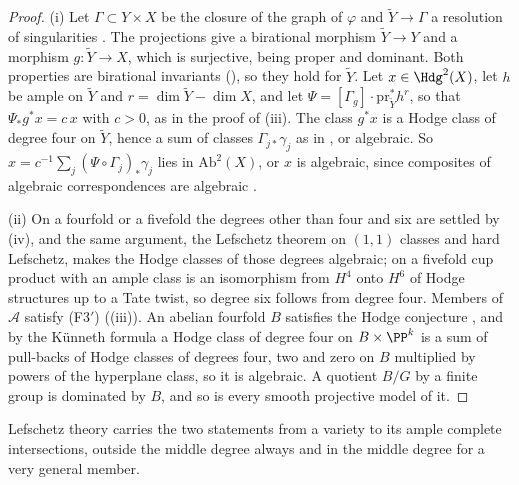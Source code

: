 \begin{proof}
(i) Let $\Gamma\subset Y\times X$ be the closure of the graph of $\varphi$
and $\widetilde Y\to\Gamma$ a resolution of singularities \cite{Hir64}. The
projections give a birational morphism $\widetilde Y\to Y$ and a morphism
$g\colon\widetilde Y\to X$, which is surjective, being proper and dominant.
Both properties are birational invariants (),
so they hold for $\widetilde Y$. Let $x\in\Hdg^{2}(X)$, let $h$ be ample on
$\widetilde Y$ and $r=\dim\widetilde Y-\dim X$, and let
$\Psi=[\Gamma_{g}]\cdot\mathrm{pr}_{\widetilde Y}^{*}h^{r}$, so that
$\Psi_{*}g^{*}x=c\,x$ with $c>0$, as in the proof of
(iii). The class $g^{*}x$ is a Hodge class of degree four
on $\widetilde Y$, hence a sum of classes $\Gamma_{j*}\gamma_{j}$ as in
, or algebraic. So $x=c^{-1}\sum_{j}(\Psi\circ
\Gamma_{j})_{*}\gamma_{j}$ lies in $\mathrm{Ab}^{2}(X)$, or $x$ is
algebraic, since composites of algebraic correspondences are algebraic
\cite[Chapter~16]{Ful98}.

(ii) On a fourfold or a fivefold the degrees other than four and six are
settled by (iv), and the same argument, the Lefschetz
theorem on $(1,1)$ classes and hard Lefschetz, makes the Hodge classes of
those degrees algebraic; on a fivefold cup product with an ample class is an
isomorphism from $H^{4}$ onto $H^{6}$ of Hodge structures up to a Tate twist,
so degree six follows from degree four. Members of $\mathcal{A}$ satisfy
\textup{(F3$'$)} ((iii)). An abelian fourfold $B$
satisfies the Hodge conjecture \cite{Mar25a,Mar25b}, and by the K\"unneth
formula a Hodge class of degree four on $B\times\PP^{k}$ is a sum of
pull-backs of Hodge classes of degrees four, two and zero on $B$ multiplied
by powers of the hyperplane class, so it is algebraic. A quotient $B/G$ by a
finite group is dominated by $B$, and so is every smooth projective model of
it.
\end{proof}

Lefschetz theory carries the two statements from a variety to its ample
complete intersections, outside the middle degree always and in the middle
degree for a very general member.

